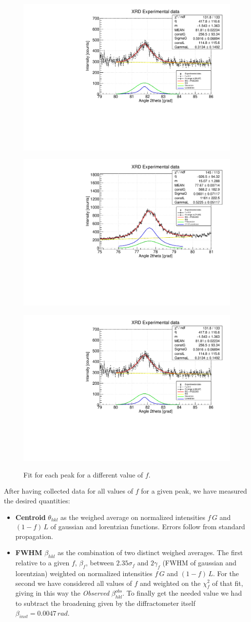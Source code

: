 \documentclass[twocolumn]{article}
\begin{document}
\begin{multicols}{2}
\begin{figure}[H]
    \centering
    {\includegraphics[width=.5\textwidth]{image/data/222_f_04.pdf}}
\end{figure}

\begin{figure}[H]
    \centering
    {\includegraphics[width=.5\textwidth]{image/data/311_f_03.pdf}}
\end{figure}

\begin{figure}[H]
    \centering
    {\includegraphics[width=.5\textwidth]{image/data/222_f_04.pdf}}
    \caption{Fit for each peak for a different value of $f$.}
    \label{fig:xrdfit}
\end{figure}
After having collected data for all values of $f$ for a given peak, we have measured the desired quantities:
\begin{itemize}
    \item {\bf Centroid} $\theta_{hkl}$ as the weighed average on normalized intensities $f\,G$ and $(1-f)\,L$ of gaussian and lorentzian functions. Errors follow from standard propagation.
   \item {\bf FWHM} $\beta_{hkl}$ as the combination of two distinct weighed averages. The first relative to a given $f$, $\beta_f$, between $2.35\sigma_f$ and $2\gamma_f$ (FWHM of gaussian and lorentzian) weighted on normalized intensities $f\,G$ and $(1-f)\, L$. For the second we have considered all values of $f$ and weighted on the $\chi^2_f$ of that fit, giving in this way the {\it Observed} $\beta_{hkl}^{obs}$. To finally get the needed value we had to subtract the broadening given by the diffractometer itself $\beta_{inst} = 0.0047\, rad$.
\end{itemize}


\end{multicols}
\end{document}
